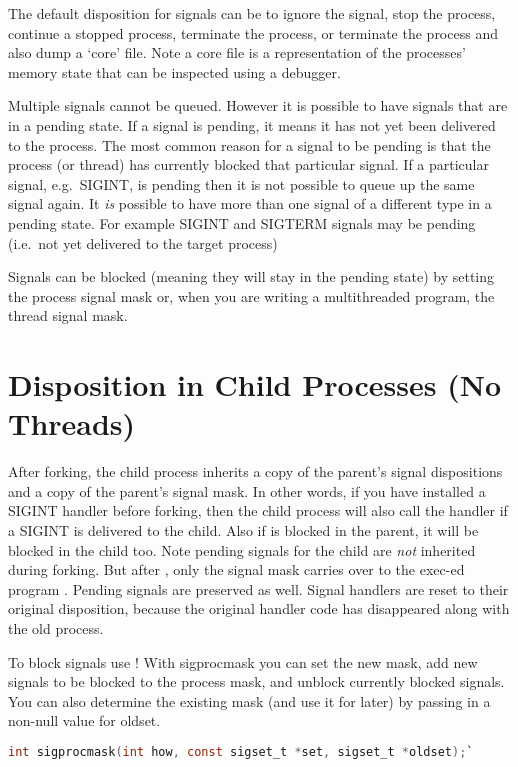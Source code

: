 The default disposition for signals can be to ignore the signal, stop the process, continue a stopped process, terminate the process, or terminate the process and also dump a `core' file. Note a core file is a representation of the processes' memory state that can be inspected using a debugger.

Multiple signals cannot be queued. However it is possible to have signals that are in a pending state. If a signal is pending, it means it has not yet been delivered to the process. The most common reason for a signal to be pending is that the process (or thread) has currently blocked that particular signal. If a particular signal, e.g.~SIGINT, is pending then it is not possible to queue up the same signal again. It \emph{is} possible to have more than one signal of a different type in a pending state. For example SIGINT and SIGTERM signals may be pending (i.e.~not yet delivered to the target process)

Signals can be blocked (meaning they will stay in the pending state) by setting the process signal mask or, when you are writing a multithreaded program, the thread signal mask.

\section{Disposition in Child Processes (No Threads)}

After forking, the child process inherits a copy of the parent's signal dispositions and a copy of the parent's signal mask. In other words, if you have installed a SIGINT handler before forking, then the child process will also call the handler if a SIGINT is delivered to the child. Also if  is blocked in the parent, it will be blocked in the child too. Note pending signals for the child are \emph{not} inherited during forking. But after , only the signal mask carries over to the exec-ed program \cite{execute}. Pending signals are preserved as well. Signal handlers are reset to their original disposition, because the original handler code has disappeared along with the old process.

To block signals use ! With sigprocmask you can set the new mask, add new signals to be blocked to the process mask, and unblock currently blocked signals. You can also determine the existing mask (and use it for later) by passing in a non-null value for oldset.

\begin{lstlisting}[language=C]
int sigprocmask(int how, const sigset_t *set, sigset_t *oldset);`
\end{lstlisting}


